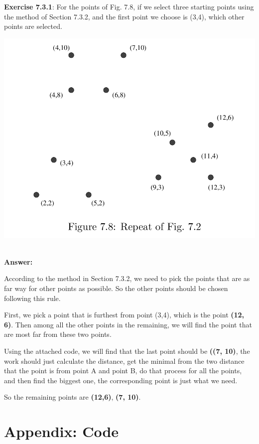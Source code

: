 \documentclass{article}
\begin{document}
\textbf{Exercise 7.3.1}: For the points of Fig. 7.8, if we select three starting points using the method
of Section 7.3.2, and the first point we choose is (3,4), which other points are selected.

\begin{center}
\includegraphics[scale=0.3]{hw4_Figure_7_8.png}
\end{center}

~\\
\textbf{Answer:}

According to the method in Section 7.3.2, we need to pick the points that are as far way for other points as possible. So the other points should be chosen following this rule.

First, we pick a point that is furthest from point (3,4), which is the point \textbf{(12, 6)}. Then among all the other points in the remaining, we will find the point that are most far from these two points.

Using the attached code, we will find that the last point should be \textbf{((7, 10)}, the work should just calculate the distance, get the minimal from the two distance that the point is from point A and point B, do that process for all the points, and then find the biggest one, the corresponding point is just what we need.

So the remaining points are \textbf{(12,6)}, \textbf{(7, 10)}.

\section{Appendix: Code}
\end{document}
